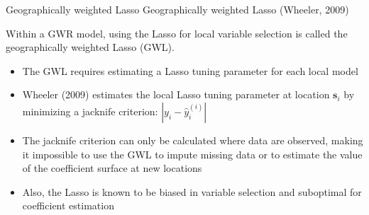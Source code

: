 \documentclass[12pt,t]{beamer}
\newcommand{\subt}[1]{{\footnotesize \color{subtitle} {#1}}}
\begin{document}
\begin{frame}{Geographically weighted Lasso}
\subt{Geographically weighted Lasso (Wheeler, 2009)}

\bigskip
Within a GWR model, using the Lasso for local variable selection is called the geographically weighted Lasso (GWL).
\begin{itemize}
    \item The GWL requires estimating a Lasso tuning parameter for each local model
    \item Wheeler (2009) estimates the local Lasso tuning parameter at location $\bm{s}_i$ by minimizing a jacknife criterion: $|y_i - \hat{y}_i^{(i)}|$
    \item The jacknife criterion can only be calculated where data are observed, making it impossible to use the GWL to impute missing data or to estimate the value of the coefficient surface at new locations
    \item Also, the Lasso is known to be biased in variable selection and suboptimal for coefficient estimation
\end{itemize}

\end{frame}
\end{document}
